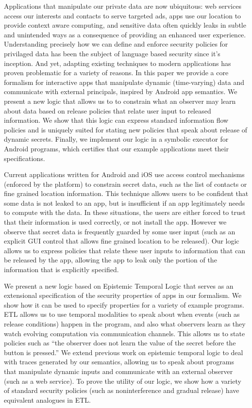 \documentclass[conference]{IEEEtran}
\theoremstyle{definition}
\newcommand{\comment}[3][\color{red}]{{#1{[{#2}: {#3}]}}}
\newcommand{\kris}[1]{\comment[\color{orange}]{kris}{#1}}
\begin{document}
Applications that manipulate our private data are now ubiquitous: web
services access our interests and contacts to serve targeted ads, apps
use our location to provide context aware computing, and sensitive
data often quickly leaks in subtle and unintended ways as a
consequence of providing an enhanced user experience.  Understanding
precisely how we can define and enforce security policies for
privilaged data has been the subject of language based security since
it's inception.  And yet, adapting existing techniques to modern
applications has proven problematic for a variety of reasons.
\kris{elaborate? Cite?} In this paper we provide a core formalism for
interactive apps that manipulate dynamic (time-varying) data and communicate
with external principals, inspired by Android app semantics.  We
present a new logic that allows us to to constrain what an observer
may learn about data based on release policies that relate user input
to released information.  We show that this logic can express standard
information flow policies and is uniquely suited for stating new
policies that speak about release of dynamic secrets.
Finally, we implement our logic in a symbolic executor for Android
programs, which certifies that our example applications meet their
specifications.

Current applications written for Android and iOS use access control
mechanisms (enforced by the platform) to constrain secret data, such
as the list of contacts or fine grained location information.  This
technique allows users to be confident that some data is not leaked to
an app, but is insufficient if an app legitimately needs to compute
with the data.  In these situations, the users are either forced to
trust that their information is used correctly, or not install the
app.  However we observe that secret data is frequently guarded by
some user input (such as an explicit GUI control that allows fine
grained location to be released).  Our logic allows us to express
policies that relate these user inputs to information that can be
released by the app, allowing the app to leak only the portion of the
information that is explicitly specified.

We present a new logic based on Epistemic Temporal Logic
\cite{Balliu:11} that serves as an extensional specification of the
security properties of apps in our formalism. We show how it can be
used to specify properties for a variety of example programs.  ETL
allows us to use temporal modalities to speak about when events (such
as release conditions) happen in the program, and also what observers
learn as they watch evolving computation via communication channels.
This allows us to state policies such as ``the observer does not learn
the value of the secret before the button is pressed.''  We extend
previous work on epistemic temporal logic to deal with traces
generated by our semantics, allowing us to speak about programs that
manipulate dynamic inputs and communicate with an external
observer (such as a web service).  To prove the utility of our logic,
we show how a variety of standard security policies (such as
noninterference and gradual release) have equivalent analogues in ETL.
\end{document}
